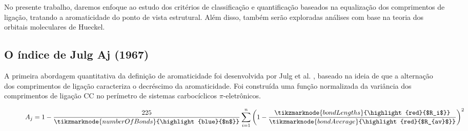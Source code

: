 No presente trabalho, daremos enfoque ao estudo dos critérios de classificação e quantificação baseados na equalização dos comprimentos de ligação, tratando a aromaticidade do ponto de vista estrutural. Além disso, também serão exploradas análises com base na teoria dos orbitais moleculares de Hueckel.

\subsection{O índice de Julg Aj (1967)}

A primeira abordagem quantitativa da definição de aromaticidade foi desenvolvida por Julg et al. \autocite{Julg1967, Bergmann1971}, baseado na ideia de que a alternação dos comprimentos de ligação caracteriza o decréscimo da aromaticidade. Foi construída uma função normalizada da variância dos comprimentos de ligação CC no perímetro de sistemas carbocíclicos $\pi$-eletrônicos.

\begin{figure}[htb]
    \vspace{2\baselineskip}
\begin{equation}
    \label{eq:1}
    A_j = 1 - \frac{225}{\tikzmarknode{numberOfBonds}{\highlight{blue}{$n$}}} \sum^n_{i=1} \bigg{(}1 - \frac{\tikzmarknode{bondLengths}{\highlight{red}{$R_i$}}}{\tikzmarknode{bondAverage}{\highlight{red}{$R_{av}$}}} \bigg{)}^2
\end{equation}
    \vspace{4\baselineskip}
\end{figure}

